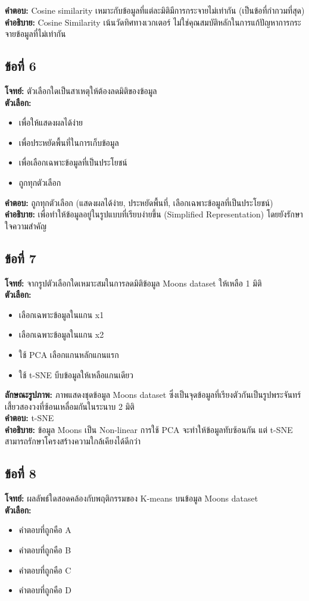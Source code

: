 \documentclass[12pt]{article}
\begin{document}
\textbf{คำตอบ:} Cosine similarity เหมาะกับข้อมูลที่แต่ละมิติมีการกระจายไม่เท่ากัน (เป็นข้อที่กำกวมที่สุด)\\
\textbf{คำอธิบาย:} Cosine Similarity เน้นวัดทิศทางเวกเตอร์ ไม่ใช่คุณสมบัติหลักในการแก้ปัญหาการกระจายข้อมูลที่ไม่เท่ากัน

\subsection*{ข้อที่ 6}
\textbf{โจทย์:} ตัวเลือกใดเป็นสาเหตุให้ต้องลดมิติของข้อมูล\\
\textbf{ตัวเลือก:}
\begin{itemize}
    \item เพื่อให้แสดงผลได้ง่าย
    \item เพื่อประหยัดพื้นที่ในการเก็บข้อมูล
    \item เพื่อเลือกเฉพาะข้อมูลที่เป็นประโยชน์
    \item ถูกทุกตัวเลือก
\end{itemize}

\textbf{คำตอบ:} ถูกทุกตัวเลือก (แสดงผลได้ง่าย, ประหยัดพื้นที่, เลือกเฉพาะข้อมูลที่เป็นประโยชน์)\\
\textbf{คำอธิบาย:} เพื่อทำให้ข้อมูลอยู่ในรูปแบบที่เรียบง่ายขึ้น (Simplified Representation) โดยยังรักษาใจความสำคัญ

\subsection*{ข้อที่ 7}
\textbf{โจทย์:} จากรูปตัวเลือกใดเหมาะสมในการลดมิติข้อมูล Moons dataset ให้เหลือ 1 มิติ\\
\textbf{ตัวเลือก:}
\begin{itemize}
    \item เลือกเฉพาะข้อมูลในแกน x1
    \item เลือกเฉพาะข้อมูลในแกน x2
    \item ใช้ PCA เลือกแกนหลักแกนแรก
    \item ใช้ t-SNE บีบข้อมูลให้เหลือแกนเดียว
\end{itemize}

\textbf{ลักษณะรูปภาพ:} ภาพแสดงชุดข้อมูล Moons dataset ซึ่งเป็นจุดข้อมูลที่เรียงตัวกันเป็นรูปพระจันทร์เสี้ยวสองวงที่ซ้อนเหลื่อมกันในระนาบ 2 มิติ\\
\textbf{คำตอบ:} t-SNE\\
\textbf{คำอธิบาย:} ข้อมูล Moons เป็น Non-linear การใช้ PCA จะทำให้ข้อมูลทับซ้อนกัน แต่ t-SNE สามารถรักษาโครงสร้างความใกล้เคียงได้ดีกว่า

\subsection*{ข้อที่ 8}
\textbf{โจทย์:} ผลลัพธ์ใดสอดคล้องกับพฤติกรรมของ K-means บนข้อมูล Moons dataset\\
\textbf{ตัวเลือก:}
\begin{itemize}
    \item คำตอบที่ถูกคือ A
    \item คำตอบที่ถูกคือ B
    \item คำตอบที่ถูกคือ C
    \item คำตอบที่ถูกคือ D
\end{itemize}
\end{document}
